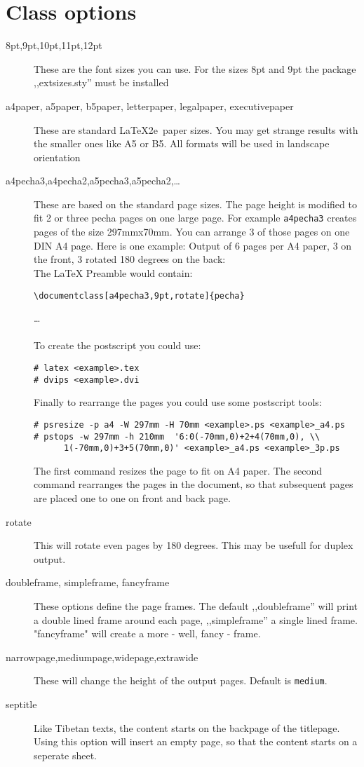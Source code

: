 \documentclass[a4paper,11pt]{article}
\begin{document}
\section{Class options}
\begin{description}
\item[8pt,9pt,10pt,11pt,12pt] These are the font sizes you can use. For the sizes 8pt and 9pt the package ,,extsizes.sty'' must be installed 
\item[a4paper, a5paper, b5paper, letterpaper, legalpaper, executivepaper] These are standard \LaTeX2e~paper sizes. You may get strange results with the smaller ones like A5 or B5. All formats will be used in landscape orientation
\item[a4pecha3,a4pecha2,a5pecha3,a5pecha2,\ldots] These are based on the standard page sizes. The page height is modified to fit 2 or three pecha pages on one large page. For example \verb-a4pecha3- creates pages of the size 297mmx70mm. You can arrange 3 of those pages on one DIN A4 page. Here is one example: Output of 6 pages per A4 paper, 3 on the front, 3 rotated 180 degrees on the back:\\
The LaTeX Preamble would contain:
\begin{verbatim}
\documentclass[a4pecha3,9pt,rotate]{pecha}
\end{verbatim}
\ldots\\\\
To create the postscript you could use:\\
\begin{verbatim}
# latex <example>.tex
# dvips <example>.dvi
\end{verbatim}
Finally to rearrange the pages you could use some postscript tools:
\begin{verbatim}
# psresize -p a4 -W 297mm -H 70mm <example>.ps <example>_a4.ps
# pstops -w 297mm -h 210mm  '6:0(-70mm,0)+2+4(70mm,0), \\
      1(-70mm,0)+3+5(70mm,0)' <example>_a4.ps <example>_3p.ps
\end{verbatim}
The first command resizes the page to fit on A4 paper. The second command rearranges the pages in the document, so that subsequent pages are placed one to one on front and back page.
\item[rotate] This will rotate even pages by 180 degrees. This may be usefull for duplex output.
\item[doubleframe, simpleframe, fancyframe] These options define the page frames. The default ,,doubleframe'' will print a double lined frame around each page, ,,simpleframe'' a single lined frame. "fancyframe" will create a more - well, fancy - frame.
\item[narrowpage,mediumpage,widepage,extrawide] These will change the height of the output pages. Default is \verb-medium-.  
\item[septitle] Like Tibetan texts, the content starts on the backpage of the titlepage. Using this option will insert an empty page, so that the content starts on a seperate sheet.
\end{description} 
\end{document}
